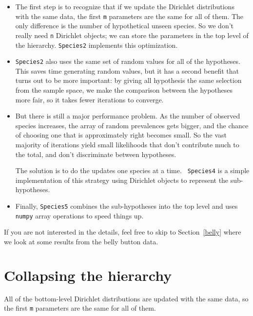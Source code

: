 \documentclass[12pt]{book}
\begin{document}
\begin{itemize}

\item The first step is to recognize that if we update the Dirichlet
  distributions with the same data, the first {\tt m} parameters are
  the same for all of them.  The only difference is the number of
  hypothetical unseen species.  So we don't really need {\tt n}
  Dirichlet objects; we can store the parameters in the top level of
  the hierarchy.  {\tt Species2} implements this optimization.

\item {\tt Species2} also uses the same set of random values for all
  of the hypotheses.  This saves time generating random values, but it
  has a second benefit that turns out to be more important: by giving
  all hypothesis the same selection from the sample space, we make
  the comparison between the hypotheses more fair, so it takes
  fewer iterations to converge.

\item But there is still a major performance problem.  As the
  number of observed species increases, the array of random
  prevalences gets bigger, and the chance of choosing one that is
  approximately right becomes small.  So the vast majority
  of iterations yield small likelihoods that don't contribute
  much to the total, and don't discriminate between hypotheses.

  The solution is to do the updates one species at a time.  {\tt
  Species4} is a simple implementation of this strategy using
  Dirichlet objects to represent the sub-hypotheses.

\item Finally, {\tt Species5} combines the sub-hypotheses into the top
  level and uses {\tt numpy} array operations to speed things up.

\end{itemize}

If you are not interested in the details, feel free to skip to
Section~\ref{belly} where we look at some results from the belly
button data.


\section{Collapsing the hierarchy}
\label{collapsing}

All of the bottom-level Dirichlet distributions are updated
with the same data, so the first {\tt m} parameters are the same for
all of them.
\end{document}
